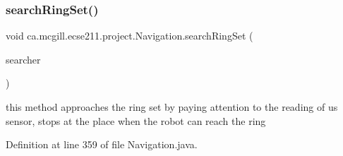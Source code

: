\subsubsection{\texorpdfstring{search\+Ring\+Set()}{searchRingSet()}}
{\footnotesize\ttfamily void ca.\+mcgill.\+ecse211.\+project.\+Navigation.\+search\+Ring\+Set (\begin{DoxyParamCaption}\item[{\hyperlink{classca_1_1mcgill_1_1ecse211_1_1threads_1_1_ring_searcher}{Ring\+Searcher}}]{searcher }\end{DoxyParamCaption})}

this method approaches the ring set by paying attention to the reading of us sensor, stops at the place when the robot can reach the ring 

Definition at line 359 of file Navigation.\+java.


